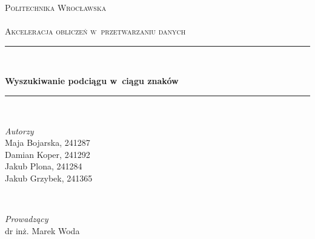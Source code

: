 
\begin{titlepage} %
	\newcommand{\HRule}{\rule{\linewidth}{0.5mm}} %

	\center %


	\textsc{\LARGE Politechnika Wrocławska}\\[1.5cm] %

	\textsc{\Large }\\[0.5cm] %

	\textsc{\large Akceleracja obliczeń w~przetwarzaniu danych}\\[0.5cm] %


	\HRule\\[0.4cm]

	{\Huge\bfseries Wyszukiwanie podciągu w~ciągu znaków \par}%
	\vspace{0.4cm}
	\HRule\\[1.5cm]


	\begin{minipage}{0.4\textwidth}
		\begin{flushleft}
			\large
			\textit{Autorzy}\\
			Maja Bojarska, \textsc{241287} \\
			Damian Koper, \textsc{241292} \\
			Jakub Plona, \textsc{241284} \\
			Jakub Grzybek, \textsc{241365} \\
		\end{flushleft}
	\end{minipage}
	~
	\begin{minipage}{0.4\textwidth}
		\begin{flushright}
			\large \textit{Prowadzący}\\
			dr inż. Marek Woda %
		\end{flushright}
	\end{minipage}


\end{titlepage}
